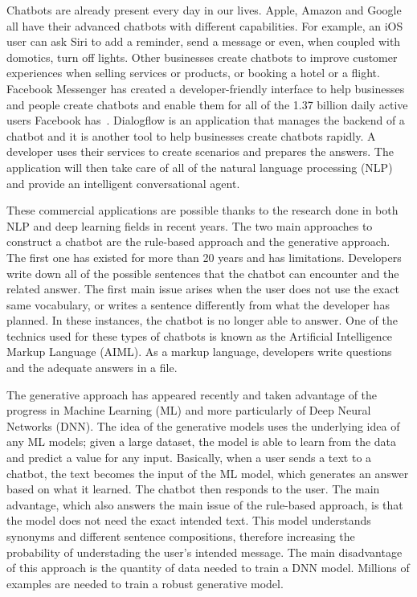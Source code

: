 Chatbots are already present every day in our lives. Apple, Amazon and Google all have their advanced chatbots with different capabilities. For example, an iOS user can ask Siri to add a reminder, send a message or even, when coupled with domotics, turn off lights. Other businesses create chatbots to improve customer experiences when selling services or products, or booking a hotel or a flight.
Facebook Messenger has created a developer-friendly interface to help businesses and people create chatbots and enable them for all of the 1.37 billion daily active users Facebook has~\citep{facebook3rdquarter2017}. Dialogflow is an application that manages the backend of a chatbot and it is another tool to help businesses create chatbots rapidly.
A developer uses their services to create scenarios and prepares the answers. The application will then take care of all of the natural language processing (NLP) and provide an intelligent conversational agent.

These commercial applications are possible thanks to the research done in both NLP and deep learning fields in recent years. The two main approaches to construct a chatbot are the rule-based approach and the generative approach.
The first one has existed for more than 20 years and has limitations. Developers write down all of the possible sentences that the chatbot can encounter and the related answer. The first main issue arises when the user does not use the exact same vocabulary, or writes a sentence differently from what the developer has planned. In these instances, the chatbot is no longer able to answer.
One of the technics used for these types of chatbots is known as the Artificial Intelligence Markup Language (AIML). As a markup language, developers write questions and the adequate answers in a file.

The generative approach has appeared recently and taken advantage of the progress in Machine Learning (ML) and more particularly of Deep Neural Networks (DNN). The idea of the generative models uses the underlying idea of any ML models; given a large dataset, the model is able to learn from the data and predict a value for any input.
Basically, when a user sends a text to a chatbot, the text becomes the input of the ML model, which generates an answer based on what it learned. The chatbot then responds to the user.
The main advantage, which also answers the main issue of the rule-based approach, is that the model does not need the exact intended text. This model understands synonyms and different sentence compositions, therefore increasing the probability of understading the user's intended message.
The main disadvantage of this approach is the quantity of data needed to train a DNN model. Millions of examples are needed to train a robust generative model.

